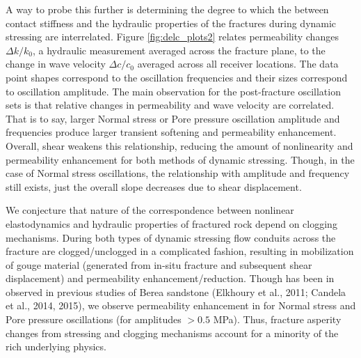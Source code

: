 A way to probe this further is determining the degree to which the between contact stiffness and the hydraulic properties of the fractures during dynamic stressing are interrelated. Figure \ref{fig:delc_plots2} relates permeability changes $ \Delta k/k_0 $, a hydraulic measurement averaged across the fracture plane, to the change in wave velocity $ \Delta c/c_0 $ averaged across all receiver locations. The data point shapes correspond to the oscillation frequencies and their sizes correspond to oscillation amplitude. The main observation for the post-fracture oscillation sets is that relative changes in permeability and wave velocity are correlated. That is to say, larger Normal stress or Pore pressure oscillation amplitude and frequencies produce larger transient softening and permeability enhancement. Overall, shear weakens this relationship, reducing the amount of nonlinearity and permeability enhancement for both methods of dynamic stressing. Though, in the case of Normal stress oscillations, the relationship with amplitude and frequency still exists, just the overall slope decreases due to shear displacement. 

We conjecture that nature of the correspondence between nonlinear elastodynamics and hydraulic properties of fractured rock depend on clogging mechanisms. During both types of dynamic stressing flow conduits across the fracture are clogged/unclogged in a complicated fashion, resulting in mobilization of gouge material (generated from in-situ fracture and subsequent shear displacement) and permeability enhancement/reduction. Though has been in observed in previous studies of Berea sandstone (Elkhoury et al., 2011; Candela et al., 2014, 2015), we observe permeability enhancement in for Normal stress and Pore pressure oscillations (for amplitudes $ > 0.5 $  MPa). Thus, fracture asperity changes from stressing and clogging mechanisms account for a minority of the rich underlying physics.     

